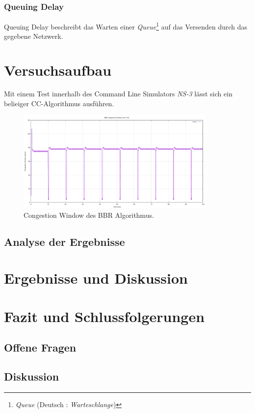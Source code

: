 \documentclass[paper=a4,fontsize=12pt,ngerman]{scrartcl}
\begin{document}
\subsubsection{Queuing Delay}
Queuing Delay beschreibt das Warten einer \textit{Queue}\footnote{\textit{Queue} (Deutsch : \textit{Warteschlange})} 
auf das Versenden durch das gegebene Netzwerk.


\section{Versuchsaufbau}
Mit einem Test innerhalb des Command Line Simulators \textit{NS-3} lässt sich ein belieiger 
CC-Algorithmus ausführen.


\begin{figure}[ht]
    \centering
    \includegraphics[height = 5cm]{./graphics/bbrCW.pdf}
    \caption{Congestion Window des BBR Algorithmus.}
    
\end{figure}


\subsection{Analyse der Ergebnisse}


\section{Ergebnisse und Diskussion}


\section{Fazit und Schlussfolgerungen}


\subsection{Offene Fragen}


\subsection{Diskussion}
\end{document}
